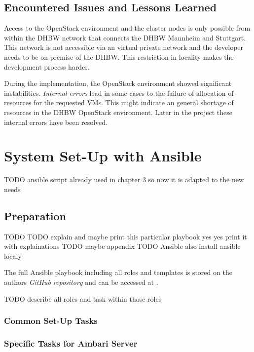 \subsection{Encountered Issues and Lessons Learned}

Access to the OpenStack environment and the cluster nodes is only possible from within the \ac{DHBW} network that connects the \ac{DHBW} Mannheim and Stuttgart.
This network is not accessible via an virtual private network and the developer needs to be on premise of the \ac{DHBW}. This restriction in locality makes the development process harder.

During the implementation, the OpenStack environment showed significant instabilities.
\emph{Internal errors} lead in some cases to the failure of allocation of resources for the requested \acp{VM}.
This might indicate an general shortage of resources in the \ac{DHBW} OpenStack environment. Later in the project these internal errors have been resolved.

\section{System Set-Up with Ansible}

TODO ansible script already used in chapter 3 so now it is adapted to the new needs

\subsection{Preparation}

TODO
TODO explain and maybe print this particular playbook yes yes print it with explainations
TODO maybe appendix
TODO Ansible
also install ansible localy


The full Ansible playbook including all roles and templates is stored on the authors \emph{GitHub repository} and can be accessed at 
.

TODO describe all roles and task within those roles

\subsubsection{Common Set-Up Tasks}

\subsubsection{Specific Tasks for Ambari Server}

